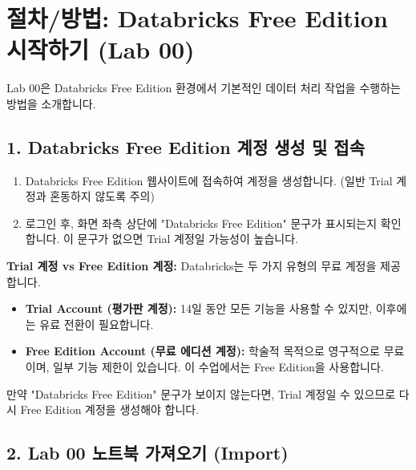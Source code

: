 \documentclass[11pt,a4paper]{article}
\begin{document}
\newpage

\section*{절차/방법: Databricks Free Edition 시작하기 (Lab 00)}

Lab 00은 Databricks Free Edition 환경에서 기본적인 데이터 처리 작업을 수행하는 방법을 소개합니다.

\subsection*{1. Databricks Free Edition 계정 생성 및 접속}

\begin{enumerate}
    \item Databricks Free Edition 웹사이트에 접속하여 계정을 생성합니다. (일반 Trial 계정과 혼동하지 않도록 주의)
    \item 로그인 후, 화면 좌측 상단에 "Databricks Free Edition" 문구가 표시되는지 확인합니다. 이 문구가 없으면 Trial 계정일 가능성이 높습니다.
\end{enumerate}

\begin{warningbox}
\textbf{Trial 계정 vs Free Edition 계정:}
Databricks는 두 가지 유형의 무료 계정을 제공합니다.
\begin{itemize}
    \item \textbf{Trial Account (평가판 계정):} 14일 동안 모든 기능을 사용할 수 있지만, 이후에는 유료 전환이 필요합니다.
    \item \textbf{Free Edition Account (무료 에디션 계정):} 학술적 목적으로 영구적으로 무료이며, 일부 기능 제한이 있습니다. 이 수업에서는 Free Edition을 사용합니다.
\end{itemize}
만약 "Databricks Free Edition" 문구가 보이지 않는다면, Trial 계정일 수 있으므로 다시 Free Edition 계정을 생성해야 합니다.
\end{warningbox}

\subsection*{2. Lab 00 노트북 가져오기 (Import)}
\end{document}
